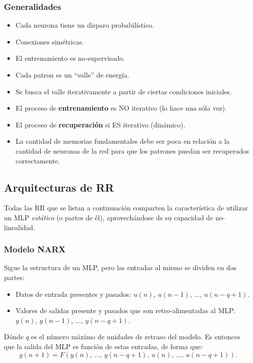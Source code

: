 \documentclass[10pt,a4paper]{article}
\begin{document}
\subsubsection{Generalidades}
\begin{multicols}{2}
\begin{itemize}
\item Cada neurona tiene un disparo probabilístico.
\item Conexiones simétricas.
\item El entrenamiento es no-supervisado.
\item Cada patron es un ``valle'' de energía.
\item Se busca el valle iterativamente a partir de ciertas condiciones iniciales.
\item El proceso de \textbf{entrenamiento} es NO iterativo (lo hace una sóla vez).
\item El proceso de \textbf{recuperación} si ES iterativo (dinámico).
\item La cantidad de memorias fundamentales debe ser poca en relación a la cantidad de neuronas de la red para que los patrones puedan ser recuperados correctamente.
\end{itemize}
\end{multicols}

\subsection{Arquitecturas de RR}

Todas las RR que se listan a continuación comparten la característica de utilizar un MLP \textit{estático} (o partes de él), aprovechándose de su capacidad de no-linealidad.

\subsubsection{Modelo NARX}

Sigue la estructura de un MLP, pero las entradas al mismo se dividen en dos partes:
\begin{itemize}
\item Datos de entrada presentes y pasados: $u(n)$, $u(n-1)$, ..., $u(n-q+1)$.
\item Valores de salidas presente y pasados que son retro-alimentadas al MLP: $y(n)$, $y(n-1)$, ..., $y(n-q+1)$.
\end{itemize}
Dónde $q$ es el número máximo de unidades de retraso del modelo. Es entonces que la salida del MLP es función de estas entradas, de forma que:
\[
y(n+1) = F(y(n),\,...,\,y(n-q+1),\,u(n),\,...,\,u(n-q+1)).
\]
\end{document}
